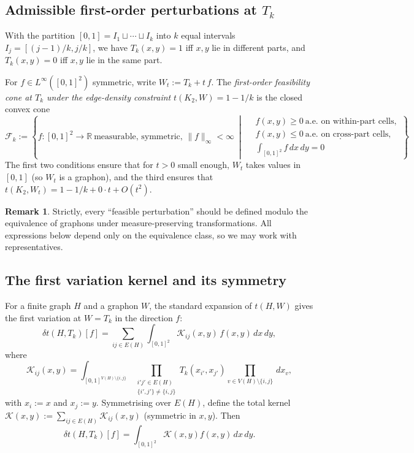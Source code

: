 \documentclass[11pt]{amsart}
\theoremstyle{definition}
\newtheorem{remark}[theorem]{Remark}
\newcommand{\1}{\mathbf 1}
\newcommand{\R}{\mathbb R}
\newcommand{\dd}{\,d}
\begin{document}
\subsection{Admissible first-order perturbations at $T_k$}

With the partition $[0,1] = I_1 \sqcup \cdots \sqcup I_k$ into $k$ equal
intervals $I_j = [(j-1)/k, j/k]$, we have $T_k(x,y) = 1$ iff $x,y$ lie in
different parts, and $T_k(x,y) = 0$ iff $x,y$ lie in the same part.

For $f\in L^\infty([0,1]^2)$ symmetric, write $W_t := T_k + t\, f$.  The
\emph{first-order feasibility cone at $T_k$ under the edge-density constraint}
$t(K_2,W) = 1-1/k$ is the closed convex cone
\begin{equation}
\label{eq:feas-cone}
\mathcal F_k := \left\{
   f : [0,1]^2 \to \R\ \text{measurable, symmetric, } \|f\|_\infty<\infty
   \ \middle|\
   \begin{aligned}
   &f(x,y)\ge 0\ \text{a.e.\ on within-part cells},\\
   &f(x,y)\le 0\ \text{a.e.\ on cross-part cells},\\
   &\int_{[0,1]^2} f \dd x\dd y = 0
   \end{aligned}
\right\}.
\end{equation}
The first two conditions ensure that for $t>0$ small enough, $W_t$ takes values
in $[0,1]$ (so $W_t$ is a graphon), and the third ensures that
$t(K_2,W_t)=1-1/k+0\cdot t + O(t^2)$.

\begin{remark}
Strictly, every ``feasible perturbation'' should be defined modulo the
equivalence of graphons under measure-preserving transformations.  All
expressions below depend only on the equivalence class, so we may work with
representatives.
\end{remark}

\subsection{The first variation kernel and its symmetry}

For a finite graph $H$ and a graphon $W$, the standard expansion of $t(H,W)$
gives the first variation at $W=T_k$ in the direction $f$:
\begin{equation}
\label{eq:first-variation}
   \delta t(H,T_k)[f]
   = \sum_{ij\in E(H)}
     \int_{[0,1]^2} \mathcal K_{ij}(x,y)\, f(x,y) \dd x\dd y,
\end{equation}
where
\[
   \mathcal K_{ij}(x,y)
   = \int_{[0,1]^{V(H)\setminus\{i,j\}}}
       \prod_{\substack{i'j'\in E(H) \\ \{i',j'\}\ne\{i,j\}}} T_k(x_{i'},x_{j'})
       \prod_{v\in V(H)\setminus\{i,j\}} \dd x_v,
\]
with $x_i:=x$ and $x_j:=y$.  Symmetrising over $E(H)$, define the total kernel
$\mathcal K(x,y) := \sum_{ij\in E(H)} \mathcal K_{ij}(x,y)$ (symmetric in
$x,y$).  Then
\[
   \delta t(H,T_k)[f] = \int_{[0,1]^2} \mathcal K(x,y) f(x,y) \dd x\dd y.
\]
\end{document}
